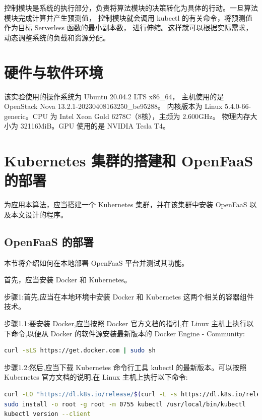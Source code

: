 \documentclass[a4paper,AutoFakeBold,oneside,12pt]{book}
\begin{document}
控制模块是系统的执行部分，负责将算法模块的决策转化为具体的行动。一旦算法模块完成计算并产生预测值，
控制模块就会调用 kubectl 的有关命令，将预测值作为目标 Serverless 函数的最小副本数，
进行伸缩。这样就可以根据实际需求，动态调整系统的负载和资源分配。

\section{硬件与软件环境}

该实验使用的操作系统为 Ubuntu 20.04.2 LTS x86\_64，
主机使用的是 OpenStack Nova 13.2.1-20230408163250\_be95288。
内核版本为 Linux 5.4.0-66-generic。CPU 为 Intel Xeon Gold 6278C（8核），主频为 2.600GHz。
物理内存大小为 32116MiB。GPU 使用的是 NVIDIA Tesla T4。




\section{Kubernetes 集群的搭建和 OpenFaaS 的部署}

为应用本算法，应当搭建一个 Kubernetes 集群，并在该集群中安装
 OpenFaaS 以及本文设计的程序。


\subsection{OpenFaaS 的部署}

本节将介绍如何在本地部署 OpenFaaS 平台并测试其功能\cite{openfaas_get_started_2019}。

首先，应当安装 Docker 和 Kubernetes。

步骤1:首先,应当在本地环境中安装 Docker 和 Kubernetes 这两个相关的容器组件技术。

步骤1.1:要安装 Docker,应当按照 Docker 官方文档的指引,在 Linux 主机上执行以下命令,以便从 Docker 的软件源安装最新版本的 Docker Engine - Community:
\begin{lstlisting}[language=bash]
curl -sLS https://get.docker.com | sudo sh
\end{lstlisting}

步骤1.2:然后,应当下载 Kubernetes 命令行工具 kubectl 的最新版本。可以按照 Kubernetes 官方文档的说明,在 Linux 主机上执行以下命令:
\begin{lstlisting}[language=bash] 
curl -LO "https://dl.k8s.io/release/$(curl -L -s https://dl.k8s.io/release/stable.txt)/bin/linux/amd64/kubectl"
sudo install -o root -g root -m 0755 kubectl /usr/local/bin/kubectl
kubectl version --client
\end{lstlisting}
\end{document}

